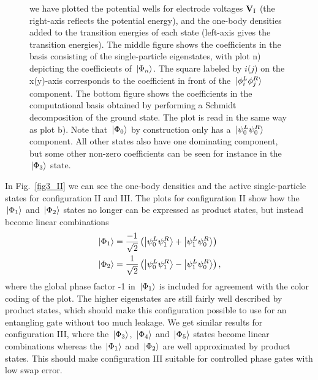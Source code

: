 \documentclass[twocolumn,superscriptaddress,unsortedaddress,
 amsmath,amssymb,
 aps,
]{revtex4-2}
\begin{document}
\begin{figure}
{        we have plotted the potential wells for electrode voltages
        $\vb{V}_{\mathrm{I}}$ (the right-axis reflects the potential energy), and the one-body
        densities added to the transition energies of each state (left-axis gives the
        transition energies).
        The middle figure %
        shows the coefficients in the basis consisting of the single-particle eigenstates, with plot n) depicting the coefficients of $\ket*{\Phi_n}$. The square labeled by $i$($j$) on the x(y)-axis corresponds to the coefficient in front of the $\ket*{\phi_i^L\phi_j^R}$ component. 
        The bottom figure %
        shows the coefficients in the computational basis obtained by performing a Schmidt decomposition of the ground state. The plot is read in the same way as plot b). Note that $\ket*{\Phi_0}$ by construction only has a $\ket*{\psi^L_0\psi^R_0}$ component. All other states also have one dominating component, but some other non-zero coefficients can be seen for instance in the $\ket*{\Phi_3}$ state.  
        }
    \end{figure}

In Fig.~\ref{fig3_II} we can see the one-body densities and the active single-particle states for configuration II and III. The plots for configuration II show how the $\ket*{\Phi_1}$ and $\ket*{\Phi_2}$ states no longer can be expressed as product states, but instead become linear combinations 
\begin{align*}
    \ket*{\Phi_1} &= \frac{-1}{\sqrt{2}}\left(\ket{\psi_0^L\psi_1^R}+\ket{\psi_1^L\psi_0^R}\right)\\
    \ket*{\Phi_2} &= \frac{1}{\sqrt{2}}\left(\ket{\psi_0^L\psi_1^R}-\ket{\psi_1^L\psi_0^R}\right),
\end{align*}
 where the global phase factor -1 in $\ket*{\Phi_1}$ is included for agreement with the color coding of the plot. The higher eigenstates are still fairly well described by product states, which should make this configuration possible to use for an entangling gate without too much leakage. We get similar results for configuration III, where the $\ket*{\Phi_3}$, $\ket*{\Phi_4}$ and $\ket*{\Phi_5}$ states become linear combinations whereas the $\ket*{\Phi_1}$ and $\ket*{\Phi_2}$ are well approximated by product states. This should make configuration III suitable for controlled phase gates with low swap error.
\end{document}
